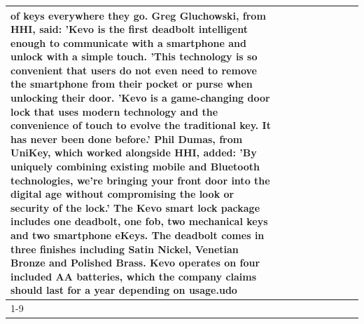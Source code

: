 \begin{table}[H]
\begin{tabular}{lllrlllll}
of keys everywhere they go. Greg Gluchowski, from HHI, said: 'Kevo is the first deadbolt intelligent enough to communicate with a smartphone and unlock with a simple touch. 'This technology is so convenient that users do not even need to remove the smartphone from their pocket or purse when unlocking their door. 'Kevo is a game-changing door lock that uses modern technology and the convenience of touch to evolve the traditional key. It has never been done before.' Phil Dumas, from UniKey, which worked alongside HHI, added: 'By uniquely combining existing mobile and Bluetooth technologies, we’re bringing your front door into the digital age without compromising the look or security of the lock.' The Kevo smart lock package includes one deadbolt, one fob, two mechanical keys and two smartphone eKeys. The deadbolt comes in three finishes including Satin Nickel, Venetian Bronze and Polished Brass. Kevo operates on four included AA batteries, which the company claims should last for a year depending on usage.udo \\
\cline{1-9}

\end{tabular}
\end{table}
